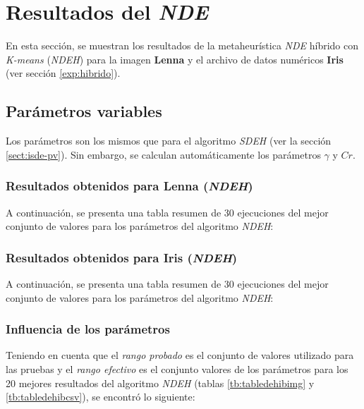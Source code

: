 \section{Resultados del \emph{NDE}}

    En esta sección, se muestran los resultados de la metaheurística \emph{NDE}
híbrido con \emph{K-means} (\emph{NDEH}) para la imagen \textbf{Lenna} y el
archivo de datos numéricos \textbf{Iris} (ver sección \ref{exp:hibrido}).

\subsection{Parámetros variables}\label{sect:inde-pv}

    Los parámetros son los mismos que para el algoritmo \emph{SDEH} (ver la sección
\ref{sect:isde-pv}). Sin embargo, se calculan automáticamente los parámetros
$\gamma$ y $Cr$.

\subsubsection{Resultados obtenidos para \textbf{Lenna} (\emph{NDEH})}

    A continuación, se presenta una tabla resumen de 30 ejecuciones del mejor
conjunto de valores para los parámetros del algoritmo \emph{NDEH}:



\subsubsection{Resultados obtenidos para \textbf{Iris} (\emph{NDEH})}

    A continuación, se presenta una tabla resumen de 30 ejecuciones del mejor
conjunto de valores para los parámetros del algoritmo \emph{NDEH}:



\subsubsection{Influencia de los parámetros}

Teniendo en cuenta que el \emph{rango probado} es el conjunto de valores utilizado
para las pruebas y el \emph{rango efectivo} es el conjunto valores de los parámetros
para los 20 mejores resultados del algoritmo \emph{NDEH} (tablas \ref{tb:tabledehibimg}
y \ref{tb:tabledehibcsv}), se encontró lo siguiente:

